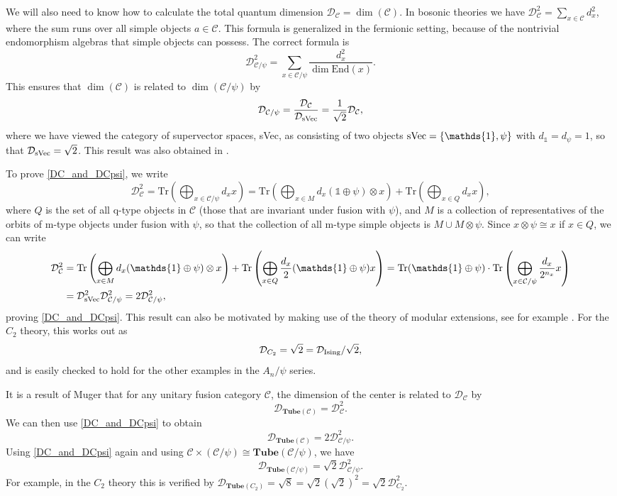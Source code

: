 \documentclass[12pt,a4paper]{article}
\newcommand{\tp}{\otimes}
\newcommand{\unit}{\mathds{1}}
\newcommand{\mcd}{\mathcal{D}}
\newcommand{\mcc}{\mathcal{C}}
\newcommand\be            {\begin{equation}}
\newcommand\ee            {\end{equation}}
\newcommand{\End}{\text{End}}
\newcommand{\tube}{\textbf{Tube}}
\begin{document}
We will also need to know how to calculate the total quantum dimension $\mcd_\mcc = \dim(\mcc)$.
In bosonic theories we have $\mcd_\mcc^2 = \sum_{x\in \mcc} d_x^2$, where the sum runs over all simple objects $a\in\mcc$. 
This formula is generalized in the fermionic setting, because of the nontrivial endomorphism algebras that simple objects can possess.  
The correct formula is
\be \label{total_qdim_defn} \mcd_{\mcc/\psi}^2 = \sum_{x\in \mcc/\psi} \frac{d_x^2}{\dim \End(x)}.\ee
This ensures that $\dim(\mcc)$ is related to $\dim(\mcc / \psi)$ by 
\be \label{DC_and_DCpsi} \mcd_{\mcc / \psi} = \frac{\mcd_\mcc}{\mcd_{\rm sVec}} = \frac{1}{\sqrt{2}} \mcd_\mcc,\ee
where we have viewed the category of supervector spaces, sVec, as consisting of two objects 
${\rm sVec} = \{\unit,\psi\}$ with $d_\unit=d_\psi=1$, so that $\mcd_{\rm sVec} = \sqrt{2}$. 
This result was also obtained in \cite{wan2016}. 

To prove \eqref{DC_and_DCpsi}, we write 
\be
\mcd_\mcc^2 = \text{Tr} \left(\bigoplus_{x\in \mcc/\psi} d_x x\right) = \text{Tr} \left( \bigoplus_{x \in M} d_x (\mathds{1} \oplus \psi) \tp x \right ) + \text{Tr} \left(\bigoplus_{x  \in Q} {d_x} x \right),\ee
where $Q$ is the set of all q-type objects in $\mcc$ (those that are invariant under fusion with $\psi$), 
and $M$ is a collection of representatives of the orbits of m-type objects under fusion with $\psi$, so that 
the collection of all m-type simple objects is $M\cup M\tp \psi$.   
Since $x\tp \psi \cong x$ if $x\in Q$, we can write
\begin{align}
\mcd_\mcc^2 & = \text{Tr} \left( \bigoplus_{x \in M} d_x (\mathds{1} \oplus \psi) \tp x \right ) + 
\text{Tr}  \left(\bigoplus_{x  \in Q}\frac{d_x}{2}(\unit \oplus \psi) x \right) = \text{Tr}(\unit \oplus \psi) 
\cdot \text{Tr} \left( \bigoplus_{x \in \mcc/\psi} \frac{d_x}{2^{n_x}} x \right) \\ & = \mcd^2_{\rm sVec} 
\mcd_{\mcc/\psi}^2 = 2 \mcd_{\mcc/\psi}^2,
\end{align}
proving \eqref{DC_and_DCpsi}. 
This result can also be motivated by making use of the theory of modular extensions, see for example \cite{lan2016}. 
For the $C_2$ theory, this works out as 
\be \mcd_{C_2} = \sqrt{2} = \mcd_{\rm Ising} / \sqrt{2},\ee
and is easily checked to hold for the other examples in the $A_n / \psi$ series.  

It is a result of Muger \cite{muger2003a,2003b} that for any unitary fusion category $\mcc$, 
the dimension of the center is related to $\mcd_\mcc$ by 
\be \mcd_{\tube(\mcc)} =\mcd^2_\mcc.\ee
We can then use \eqref{DC_and_DCpsi} to obtain 
\be \mcd_{\tube(\mcc)} = 2\mcd^2_{\mcc/\psi}.\ee
Using \eqref{DC_and_DCpsi} again and using $\mcc \times (\mcc/\psi) \cong \tube(\mcc/\psi)$, we have 
\be \mcd_{\tube(\mcc/\psi)} = \sqrt{2}\mcd^2_{\mcc/\psi}.\ee
For example, in the $C_2$ theory this is verified by $\mcd_{\tube(C_2)} = \sqrt{8} = \sqrt{2} (\sqrt{2})^2 = \sqrt{2} \mcd^2_{C_2}.$
\end{document}
